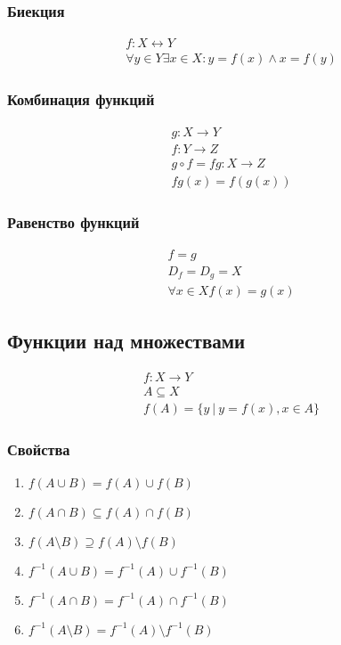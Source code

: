 \documentclass{article}
\begin{document}
\subsubsection{Биекция}
\begin{gather*}
	f : X \leftrightarrow Y \\
	\forall y \in Y \exists x \in X : y = f(x) \land x = f(y)
\end{gather*}

\subsubsection{Комбинация функций}
\begin{gather*}
	g: X \to Y \\
	f: Y \to Z \\
	g \circ f = fg : X \to Z \\
	fg(x) = f(g(x))
\end{gather*}

\subsubsection{Равенство функций}
\begin{gather*}
	f = g \\
	D_f = D_g = X \\
	\forall x \in X f(x) = g(x)
\end{gather*}

\subsection{Функции над множествами}
\begin{gather*}
	f: X \to Y \\
	A \subseteq X \\
	f(A) = \{y\ |\ y = f(x), x \in A\}
\end{gather*}

\subsubsection{Свойства}

\begin{enumerate}
	\item $f(A \cup B) = f(A) \cup f(B)$
	\item $f(A \cap B) \subseteq f(A) \cap f(B)$
	\item $f(A \setminus B) \supseteq f(A) \setminus f(B)$
	\item $f^{-1}(A \cup B) = f^{-1}(A) \cup f^{-1}(B)$
	\item $f^{-1}(A \cap B) = f^{-1}(A) \cap f^{-1}(B)$
	\item $f^{-1}(A \setminus B) = f^{-1}(A) \setminus f^{-1}(B)$
\end{enumerate}
\end{document}
